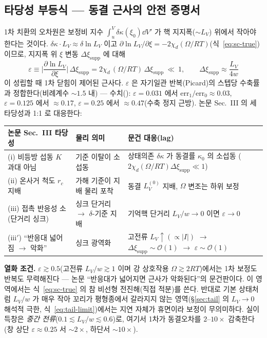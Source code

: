 \subsection{타당성 부등식 --- 동결 근사의 안전 증명서}\label{sec:sc-valid-sub}
1차 치환의 오차원은 보정비 지수 $\int_u^V\delta\kappa(\xi_0)\dd V'$ 가 핵 지지폭($\sim L_V$) 위에서 작아야 한다는 것이다.
$\delta\kappa\cdot L_V\approx\delta\ln L_V$ 이고 $\partial\ln L_V/\partial\xi=-2\chi_d(\Omega/RT)$(식~\eqref{eq:sc-true})이므로,
지지폭 위 $\xi$ 변동 $\Delta\xi_{\text{supp}}$ 에 대해
\begin{equation}
\boxed{\;\varepsilon\equiv\Big|\frac{\partial\ln L_V}{\partial\xi}\Big|\,\Delta\xi_{\text{supp}}
=2\chi_d\,(\Omega/RT)\,\Delta\xi_{\text{supp}}\ \ll\ 1,\qquad \Delta\xi_{\text{supp}}\approx\frac{L_V}{4w}\;}
\label{eq:sc-valid}
\end{equation}
이 성립할 때 1차 닫힘이 제어된 근사다. $\varepsilon$ 은 자기일관 반복(Picard)의 스텝당 수축률과 정합한다(비례계수
$\sim1.5$ 내) --- 수치(): $\varepsilon=0.031$ 에서 $\mathrm{err}_1/\mathrm{err}_0\approx0.03$,
$\varepsilon=0.125$ 에서 $\approx0.17$, $\varepsilon=0.25$ 에서 $\approx0.47$(수축 정지 근방). 논문 Sec.~III 의 세 타당성과 1:1 로 대응한다:
\begin{center}
\renewcommand{\arraystretch}{1.25}
\begin{tabular}{@{}p{}p{}p{}@{}}
\toprule
논문 Sec.~III 타당성 & 물리 의미 & 문건 대응(lag) \\
\midrule
(i) 비등방 섭동 $K$ 과대 아님 & 기준 이탈이 소섭동 & 상태의존 $\delta\kappa$ 가 동결률 $\kappa_0$ 의 소섭동 ($2\chi_d(\Omega/RT)\Delta\xi_{\text{supp}}\ll1$) \\
(ii) 온사거 척도 $r_c$ 지배 & 가해 기준이 지배 물리 포착 & 동결 $L_V^{(0)}$ 지배, $\Omega$ 변조는 하위 보정 \\
(iii) 접촉 반응성 소(단거리 싱크) & 싱크 단거리 $\to$ $\delta$-기준 지배 & 기억핵 단거리 $L_V/w\to0$ 이면 $\varepsilon\to0$ \\
(iii$'$) ``반응대 넓어짐 $\to$ 악화'' & 싱크 광역화 & 고전류 $L_V\!\uparrow(\propto|I|)$ $\to$ $\Delta\xi_{\text{supp}}\!\sim\!\mathcal O(1)$ $\to$ $\varepsilon\!\sim\!\mathcal O(1)$ \\
\bottomrule
\end{tabular}
\end{center}

\begin{warnbox}
\textbf{열화 조건.} $\varepsilon\gtrsim0.5$(고전류 $L_V/w\gtrsim1$ 이며 강 상호작용 $\Omega\gtrsim2RT$)에서는 1차 보정도
반복도 무력해진다 --- 논문 ``반응대가 넓어지면 근사가 악화된다''의 문건판이다. 이 영역에서는 식~\eqref{eq:sc-true} 의
참 비선형 전진해(직접 적분)를 쓴다. 반대로 기본 상태처럼 $L_V/w$ 가 매우 작아 꼬리가 평형종에서 갈라지지 않는
영역(\S\ref{sec:tail} 의 $L_V\!\to\!0$ 해석적 극한, 식~\eqref{eq:tail-limit})에서는 지연 자체가 휴면이라 보정이 무의미하다.
실이득창은 \emph{중간 전류}($0.1\lesssim L_V/w\lesssim0.6$)로, 여기서 1차가 동결오차를 $2$--$10\times$ 감축한다
(창 상단 $\varepsilon\!\approx\!0.25$ 서 $\sim\!2\times$, 하단서 $\sim\!10\times$).
\end{warnbox}


